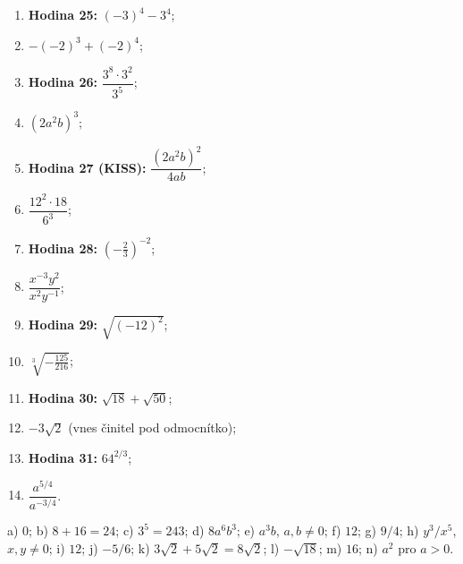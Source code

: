 \documentclass[11pt,a4paper]{article}
\begin{document}
\begin{zadaniReseniBox}[title={Domácí úkol}]
\begin{enumerate}[label=\alph*)]
\item \textbf{Hodina 25:} $(-3)^4-3^4$;
\item $-(-2)^3+(-2)^4$;
\item \textbf{Hodina 26:} $\dfrac{3^8\cdot3^2}{3^5}$;
\item $(2a^2b)^3$;
\item \textbf{Hodina 27 (KISS):} $\dfrac{(2a^2b)^2}{4ab}$;
\item $\dfrac{12^2\cdot18}{6^3}$;
\item \textbf{Hodina 28:} $\left(-\frac23\right)^{-2}$;
\item $\dfrac{x^{-3}y^2}{x^2y^{-1}}$;
\item \textbf{Hodina 29:} $\sqrt{(-12)^2}$;
\item $\sqrt[3]{-\frac{125}{216}}$;
\item \textbf{Hodina 30:} $\sqrt{18}+\sqrt{50}$;
\item $-3\sqrt2$ (vnes činitel pod odmocnítko);
\item \textbf{Hodina 31:} $64^{2/3}$;
\item $\dfrac{a^{5/4}}{a^{-3/4}}$.
\end{enumerate}
\tcblower
 a) $0$; b) $8+16=24$;
 c) $3^5=243$; d) $8a^6b^3$;
 e) $a^3b$, $a,b\ne0$;
 f) $12$;
 g) $9/4$;
 h) $y^3/x^5$, $x,y\ne0$;
 i) $12$; j) $-5/6$;
 k) $3\sqrt2+5\sqrt2=8\sqrt2$; l) $-\sqrt{18}$;
 m) $16$; n) $a^2$ pro $a>0$.
\end{zadaniReseniBox}
\end{document}
